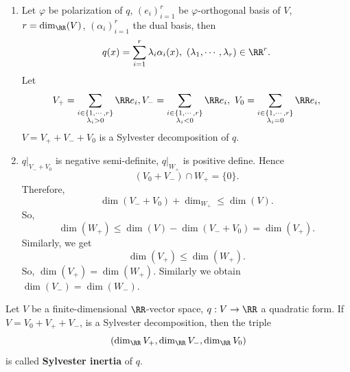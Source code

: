 \begin{proofenv}
    \quad 
    \begin{enumerate}
        \item Let $\varphi$ be polarization of $q$, $\left(e_i\right)_{i=1}^r $ be $\varphi$-orthogonal basis of $V$, $r = \dim_{\RR}(V)$, $\left(\alpha_i\right)_{i=1}^r$ the dual basis, then 
            $$ q(x) = \sum_{i=1}^{r} \lambda_{i} \alpha_i(x) ,\ \left(\lambda_1,\cdots , \lambda_r\right) \in \RR^r.$$
            Let
            $$ V_+ = \sum_{\substack{i\in \{1,\cdots,r\}\\ \lambda_i>0}} \RR e_i, V_- = \sum_{\substack{i\in \{1,\cdots,r\}\\ \lambda_i<0}} \RR e_i,\ V_0 = \sum_{\substack{i\in \{1,\cdots,r\}\\ \lambda_i=0}} \RR e_i,$$
            $V = V_+ + V_- +V_0$ is a Sylvester decomposition of $q$.
        \item $q|_{V_- + V_0}$ is negative semi-definite, $q|_{W_+}$ is positive define. 
            Hence 
            $$ \left(V_0 + V_-\right)\cap W_+ = \{0\}.$$
            Therefore,
            $$ \dim\left(V_- + V_0\right) + \dim_{W_+} \le \dim(V).$$
            So,
            $$ \dim(W_+) \le \dim(V) - \dim(V_- + V_0) = \dim(V_+).$$
            Similarly, we get
            $$ \dim(V_+) \le \dim(W_+).$$
            So, $\dim(V_+)= \dim(W_+)$. Similarly we obtain $\dim(V_-) = \dim(W_-)$.
    \end{enumerate}
    
\end{proofenv}
\begin{definitionenv}
    Let $V$ be a finite-dimensional $\RR$-vector space, $q:V\rightarrow \RR$ a quadratic form.
    If $V = V_0 + V_+ +V_-$, is a Sylvester decomposition, then the triple
    $$ \left(\dim_{\RR} V_+, \dim_{\RR} V_-, \dim_{\RR} V_0\right)$$
    is called \textbf{Sylvester inertia} of $q$.
\end{definitionenv}
